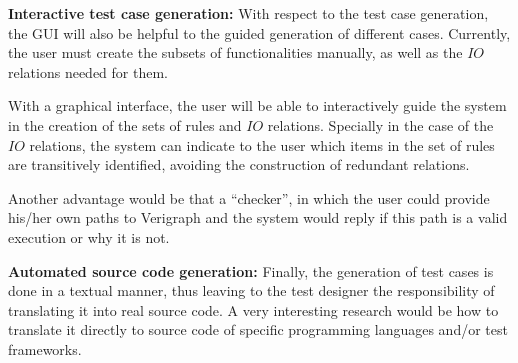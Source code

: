 \textbf{Interactive test case generation:} With respect to the test case generation, the GUI will also be helpful to the guided generation of different cases. Currently, the user must create the subsets of functionalities manually, as well as the $IO$ relations needed for them.

With a graphical interface, the user will be able to interactively guide the system in the creation of the sets of rules and $IO$ relations. Specially in the case of the $IO$ relations, the system can indicate to the user which items in the set of rules are transitively identified, avoiding the construction of redundant relations.

Another advantage would be that a ``checker'', in which the user could provide his/her own paths to Verigraph and the system would reply if this path is a valid execution or why it is not.

\textbf{Automated source code generation:}
  Finally, the generation of test cases is done in a textual manner, thus leaving to the test designer the responsibility of translating it into real source code. A very interesting research would be how to translate it directly to source code of specific programming languages and/or test frameworks.
